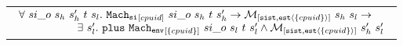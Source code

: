 \begin{lemma}
\begin{tabular}{P{0.95\textwidth}}
$
\begin{array}{l}
\forall \ si\_o \ s_h \ s_h' \ t \ s_l . \ \singlestep{cpuid}{si\_o}{s_h}{t}{s_h'} \rightarrow  \matchsinglestatestate{\set{cpuid}}{s_h}{s_l} \rightarrow \\
\ \ \ \ \ \ \ \ \ \ \ \ \ \ \ \ \exists\ s_l' . \  \ccplusstep{\envstep{\set{cpuid}}{si\_o}{s_l}{t}{s_l'}} \wedge  \matchsinglestatestate{\set{cpuid}}{s_h'}{s_l'}\\
\end{array}
$
\end{tabular}
\end{lemma}

